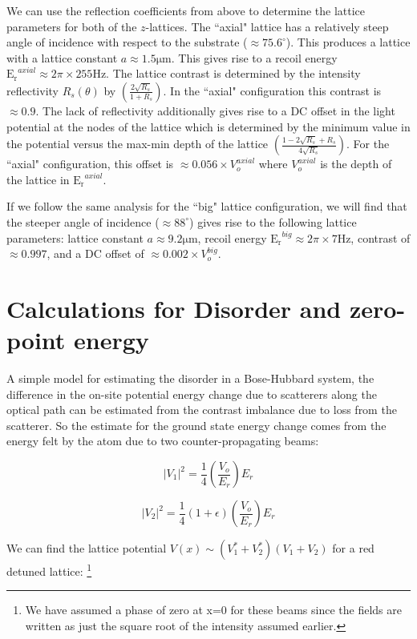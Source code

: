 We can use the reflection coefficients from above to determine the lattice parameters for both of the $z$-lattices. The ``axial" lattice has a relatively steep angle of incidence with respect to the substrate  ($\approx 75.6^\circ$). This produces a lattice with a lattice constant $a\approx 1.5 \mathrm{\mu m}$. This gives rise to a recoil energy $\mathrm{E_r}^{axial} \approx 2\pi \times 255 \mathrm{Hz}$. The lattice contrast is determined by the intensity reflectivity $R_s (\theta)$ by $\left ( \frac{2 \sqrt{R_s}}{1 + R_s}\right )$. In the ``axial" configuration this contrast is $\approx 0.9$. The lack of reflectivity additionally gives rise to a DC offset in the light potential at the nodes of the lattice which is determined by the minimum value in the potential versus the max-min depth of the lattice $\left ( \frac{1-2\sqrt{R_s}+R_s}{4 \sqrt{R_s}}\right )$.  For the ``axial" configuration, this offset is $\approx 0.056 \times V_o^{axial}$ where $V_o^{axial}$ is the depth of the lattice in $\mathrm{E_r}^{axial}$.

If we follow the same analysis for the ``big" lattice configuration, we will find that the steeper angle of incidence ($\approx 88^\circ$) gives rise to the following lattice parameters: lattice constant $a \approx 9.2 \mathrm{\mu m}$, recoil energy $\mathrm{E_r}^{big}\approx 2\pi \times 7 \mathrm{Hz}$, contrast of $\approx 0.997$, and a DC offset of $\approx 0.002 \times V_o^{big}$.



\section{Calculations for Disorder and zero-point energy}

A simple model for estimating the disorder in a Bose-Hubbard system, the difference in the on-site potential energy change due to scatterers along the optical path can be estimated from the contrast imbalance due to loss from the scatterer. So the estimate for the ground state energy change comes from the energy felt by the atom due to two counter-propagating beams:

\[
|V_1|^2 = \frac{1}{4} \left ( \frac{V_o}{E_r} \right ) E_r
\]

\[
|V_2|^2 = \frac{1}{4} \left ( 1+  \epsilon \right ) \left ( \frac{V_o}{E_r} \right ) E_r
\]

We can find the lattice potential $V(x) \sim \left ( V_1^* + V_2^* \right ) \left ( V_1 + V_2 \right )$ for a red detuned lattice: \footnote{We have assumed a phase of zero at x=0 for these beams since the fields are written as just the square root of the intensity assumed earlier.} 

